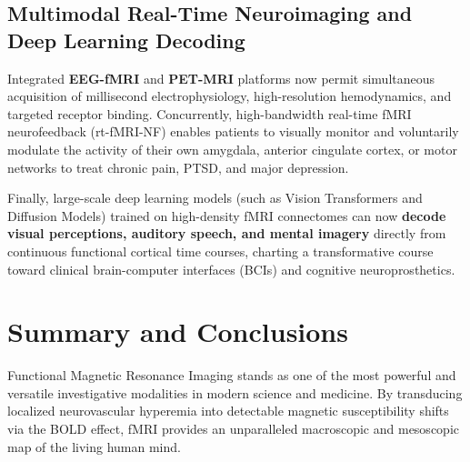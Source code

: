 \documentclass[11pt,a4paper]{article}
\begin{document}
\subsection{Multimodal Real-Time Neuroimaging and Deep Learning Decoding}
Integrated \textbf{EEG-fMRI} and \textbf{PET-MRI} platforms now permit simultaneous acquisition of millisecond electrophysiology, high-resolution hemodynamics, and targeted receptor binding. Concurrently, high-bandwidth real-time fMRI neurofeedback (rt-fMRI-NF) enables patients to visually monitor and voluntarily modulate the activity of their own amygdala, anterior cingulate cortex, or motor networks to treat chronic pain, PTSD, and major depression.

Finally, large-scale deep learning models (such as Vision Transformers and Diffusion Models) trained on high-density fMRI connectomes can now \textbf{decode visual perceptions, auditory speech, and mental imagery} directly from continuous functional cortical time courses, charting a transformative course toward clinical brain-computer interfaces (BCIs) and cognitive neuroprosthetics.

\section{Summary and Conclusions}
Functional Magnetic Resonance Imaging stands as one of the most powerful and versatile investigative modalities in modern science and medicine. By transducing localized neurovascular hyperemia into detectable magnetic susceptibility shifts via the BOLD effect, fMRI provides an unparalleled macroscopic and mesoscopic map of the living human mind.
\end{document}
